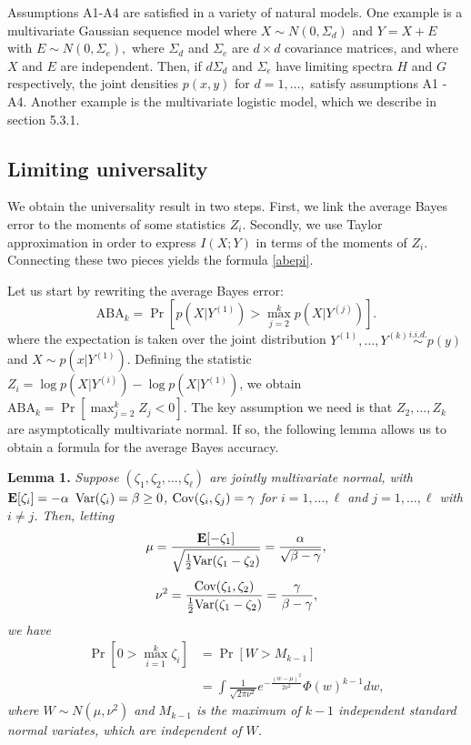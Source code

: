 Assumptions A1-A4 are satisfied in a variety of natural models.  One
example is a multivariate Gaussian sequence model where $X \sim N(0,
\Sigma_d)$ and $ Y = X + E $ with $ E \sim N(0, \Sigma_e), $ where
$\Sigma_d$ and $\Sigma_e$ are $d \times d$ covariance matrices, and
where $X$ and $E$ are independent.  Then, if $d \Sigma_d$ and
$\Sigma_e$ have limiting spectra $H$ and $G$ respectively, the joint
densities $p(x, y)$ for $d = 1,\hdots, $ satisfy assumptions A1 - A4.
Another example is the multivariate logistic model, which we describe
in section 5.3.1.  

\subsection{Limiting universality}

We obtain the universality result in two steps.  First, we link the
average Bayes error to the moments of some statistics $Z_i$.
Secondly, we use Taylor approximation in order to express $I(X; Y)$ in
terms of the moments of $Z_i$.  Connecting these two pieces yields the
formula \eqref{abepi}.

Let us start by rewriting the average Bayes error:
\[
\text{ABA}_k = \Pr[p(X|Y^{(1)}) > \max_{j = 2}^k p(X|Y^{(j)})].
\]
where the expectation is taken over the joint distribution
$Y^{(1)},\hdots, Y^{(k)} \stackrel{i.i.d.}{\sim} p(y)$ and $X \sim p(x|Y^{(1)})$.  Defining
the statistic $Z_i = \log p(X|Y^{(i)}) - \log p(X|Y^{(1)})$, we obtain
$ \text{ABA}_k = \Pr[\max_{j = 2}^k Z_j < 0].  $ The key assumption we
need is that $Z_2,\hdots, Z_k$ are asymptotically multivariate normal.
If so, the following lemma allows us to obtain a formula for the
average Bayes accuracy.

\textbf{Lemma 1. }
\emph{
Suppose $(\zeta_1, \zeta_2, \hdots, \zeta_\ell)$ are jointly multivariate normal, with 
$\textbf{E}[\zeta_i]= -\alpha$ 
$\text{Var}(\zeta_i) = \beta \geq 0$, 
$\text{Cov}(\zeta_i, \zeta_j) = \gamma$ for $i = 1,\hdots,\ell$ and $j = 1,\hdots, \ell$ with $i \neq j$. 
Then, letting
\[
\mu = \frac{\textbf{E}[-\zeta_1]}{\sqrt{\frac{1}{2}\text{Var}(\zeta_1 - \zeta_2)}} = \frac{\alpha}{\sqrt{\beta - \gamma}},
\]
\[
\nu^2 = \frac{\text{Cov}(\zeta_1, \zeta_2)}{\frac{1}{2}\text{Var}(\zeta_1 - \zeta_2)} = \frac{\gamma}{\beta - \gamma},
\]
we have
\begin{align*}
\Pr[0 > \max_{i=1}^k \zeta_i] &= \Pr[W > M_{k-1}]
\\&= \int \frac{1}{\sqrt{2\pi\nu^2}} e^{-\frac{(w-\mu)^2}{2\nu^2}} \Phi(w)^{k-1} dw,
\end{align*}
where $W \sim N(\mu, \nu^2)$ and $M_{k-1}$ is the maximum of $k-1$
independent standard normal variates, which are independent of $W$.
}

